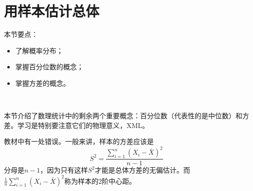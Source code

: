 \section{用样本估计总体}

本节要点：
\begin{itemize}
    \item 了解概率分布；
    \item 掌握百分位数的概念；
    \item 掌握方差的概念。
\end{itemize}

~

本节介绍了数理统计中的剩余两个重要概念：百分位数（代表性的是中位数）和方差。学习是特别要注意它们的物理意义，XML。

\begin{tcolorbox}
教材中有一处错误。一般来讲，样本的方差应该是
\[
S^2=\frac{\sum_{i=1}^n{\left( X_i-\bar{X} \right)}^2}{n-1}
\]
分母是$n-1$，因为只有这样$S^2$才能是总体方差的无偏估计。而$\frac{1}{n}\sum_{i=1}^n{\left( X_i-\bar{X} \right)}^2$称为样本的2阶中心距。
\end{tcolorbox}




